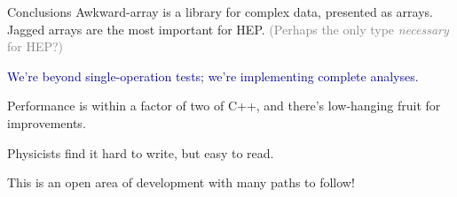 \documentclass[aspectratio=169]{beamer}
\begin{document}
\begin{frame}{Conclusions}
\large
\vspace{0.5 cm}
Awkward-array is a library for complex data, presented as arrays. Jagged arrays are the most important for HEP. \textcolor{gray}{(Perhaps the only type {\it necessary} for HEP?)}


\vspace{0.5 cm}
\textcolor{darkblue}{We're beyond single-operation tests; we're implementing complete analyses.}

Performance is within a factor of two of C++, and there's low-hanging fruit for improvements.

\vspace{0.5 cm}
Physicists find it hard to write, but easy to read.

\vspace{0.5 cm}
This is an open area of development with many paths to follow!
\end{frame}
\end{document}
